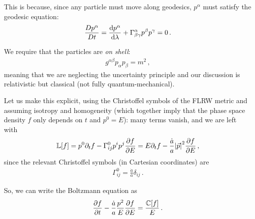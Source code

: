 \documentclass[main.tex]{subfiles}
\begin{document}

This is because, since any particle must move along geodesics, \(p^{\alpha }\) must satisfy the geodesic equation: 
%
\begin{align}
\frac{Dp^{\alpha }}{Dt } =
\dv{p^{\alpha }}{\lambda } + \Gamma^{\alpha }_{\beta \gamma } p^{\beta } p^{\gamma }=0
\,.
\end{align}

We require that the particles are \emph{on shell}:
%
\begin{align}
  g^{\alpha \beta } p_{\alpha } p_{\beta } = m^2
\,,
\end{align}
%
meaning that we are neglecting the uncertainty principle and our discussion is relativistic but classical (not fully quantum-mechanical).


Let us make this explicit, using the Christoffel symbols of the FLRW metric and assuming isotropy and homogeneity (which together imply that the phase space density \(f\) only depends on \(t\) and \(p^{0} = E\)): many terms vanish, and we are left with
%
\begin{align}
\mathbb{L}[f]  
= p^{0} \partial_{t}f - \Gamma^{0}_{ij} p^{i} p^{j} \pdv{f}{E}
= E \partial_t f - \frac{\dot{a}}{a} \abs{\vec{p}}^2 \pdv{f}{E}
\,,
\end{align}
%
since the relevant Christoffel symbols (in Cartesian coordinates) are 
%
\begin{align}
  \Gamma^{0}_{ij } = \frac{\dot{a}}{a} \delta_{ij }
\,.
\end{align}

So, we can write the Boltzmann equation as 
%
\begin{align}
\pdv{f}{t} - \frac{\dot{a}}{a} \frac{p^2}{E} \pdv{f}{E} = \frac{\mathbb{C} [f]}{E}
\,.
\end{align}

\end{document}
